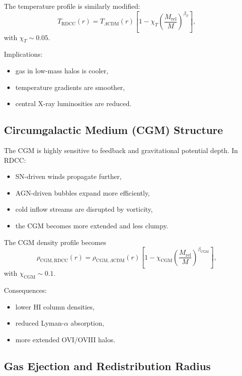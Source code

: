 \documentclass[11pt,a4paper]{article}
\begin{document}
The temperature profile is similarly modified:
\begin{equation}
T_{\mathrm{RDCC}}(r)
=
T_{\Lambda\mathrm{CDM}}(r)
\left[
1
-
\chi_{T}
\left(
\frac{M_{\mathrm{rel}}}{M}
\right)^{\beta_{T}}
\right],
\end{equation}
with $\chi_{T} \sim 0.05$.

Implications:
\begin{itemize}
\item gas in low-mass halos is cooler,
\item temperature gradients are smoother,
\item central X-ray luminosities are reduced.
\end{itemize}

\subsection{Circumgalactic Medium (CGM) Structure}

The CGM is highly sensitive to feedback and gravitational potential depth. In RDCC:
\begin{itemize}
\item SN-driven winds propagate further,
\item AGN-driven bubbles expand more efficiently,
\item cold inflow streams are disrupted by vorticity,
\item the CGM becomes more extended and less clumpy.
\end{itemize}

The CGM density profile becomes
\begin{equation}
\rho_{\mathrm{CGM,RDCC}}(r)
=
\rho_{\mathrm{CGM},\Lambda\mathrm{CDM}}(r)
\left[
1
-
\chi_{\mathrm{CGM}}
\left(
\frac{M_{\mathrm{rel}}}{M}
\right)^{\beta_{\mathrm{CGM}}}
\right],
\end{equation}
with $\chi_{\mathrm{CGM}} \sim 0.1$.

Consequences:
\begin{itemize}
\item lower HI column densities,
\item reduced Lyman-$\alpha$ absorption,
\item more extended OVI/OVIII halos.
\end{itemize}

\subsection{Gas Ejection and Redistribution Radius}
\end{document}
